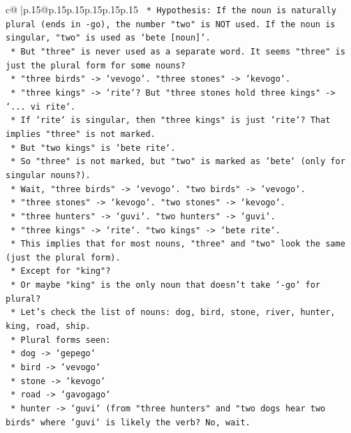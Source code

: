 \documentclass{article}
\begin{document}
{\begin{supertabular}{c@{$\;$}|p{.15\linewidth}@{}p{.15\linewidth}p{.15\linewidth}p{.15\linewidth}p{.15\linewidth}p{.15\linewidth}}
{{{\texttt{        *   Hypothesis: If the noun is naturally plural (ends in {-}go), the number "two" is NOT used. If the noun is singular, "two" is used as `bete {[}noun{]}`.} \\
\texttt{        *   But "three" is never used as a separate word. It seems "three" is just the plural form for some nouns?} \\
\texttt{        *   "three birds" {-}> `vevogo`. "three stones" {-}> `kevogo`.} \\
\texttt{        *   "three kings" {-}> `rite`? But "three stones hold three kings" {-}> `... vi rite`.} \\
\texttt{        *   If `rite` is singular, then "three kings" is just `rite`? That implies "three" is not marked.} \\
\texttt{        *   But "two kings" is `bete rite`.} \\
\texttt{        *   So "three" is not marked, but "two" is marked as `bete` (only for singular nouns?).} \\
\texttt{        *   Wait, "three birds" {-}> `vevogo`. "two birds" {-}> `vevogo`.} \\
\texttt{        *   "three stones" {-}> `kevogo`. "two stones" {-}> `kevogo`.} \\
\texttt{        *   "three hunters" {-}> `guvi`. "two hunters" {-}> `guvi`.} \\
\texttt{        *   "three kings" {-}> `rite`. "two kings" {-}> `bete rite`.} \\
\texttt{        *   This implies that for most nouns, "three" and "two" look the same (just the plural form).} \\
\texttt{        *   Except for "king"?} \\
\texttt{        *   Or maybe "king" is the only noun that doesn't take `{-}go` for plural?} \\
\texttt{        *   Let's check the list of nouns: dog, bird, stone, river, hunter, king, road, ship.} \\
\texttt{        *   Plural forms seen:} \\
\texttt{            *   dog {-}> `gepego`} \\
\texttt{            *   bird {-}> `vevogo`} \\
\texttt{            *   stone {-}> `kevogo`} \\
\texttt{            *   road {-}> `gavogago`} \\
\texttt{            *   hunter {-}> `guvi` (from "three hunters" and "two dogs hear two birds" where `guvi` is likely the verb? No, wait.} \\
}}}
\end{supertabular}}
\end{document}
